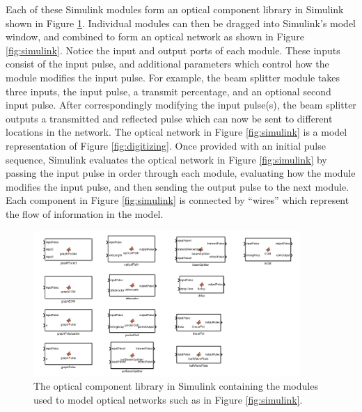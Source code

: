 \documentclass[pdftex,12pt,a4paper]{article}
\begin{document}
Each of these Simulink modules form an optical component library in Simulink shown in Figure \ref{fig:componentLibrary}. Individual modules can then be dragged into Simulink's model window, and combined to form an optical network as shown in Figure \ref{fig:simulink}. Notice the input and output ports of each module. These inputs consist of the input pulse, and  additional parameters which control how the module modifies the input pulse. For example, the beam splitter module takes three inputs, the input pulse, a transmit percentage, and an optional second input pulse. After correspondingly modifying the input pulse(s), the beam splitter outputs a transmitted and reflected pulse which can now be sent to different locations in the network. The optical network in Figure \ref{fig:simulink} is a model representation of Figure \ref{fig:digitizing}. Once provided with an initial pulse sequence, Simulink evaluates the optical network in Figure \ref{fig:simulink} by passing the input pulse in order through each module, evaluating how the module modifies the input pulse, and then sending the output pulse to the next module. Each component in Figure \ref{fig:simulink} is connected by ``wires'' which represent the flow of information in the model.  


\begin{figure}[H]
  \centering
    \includegraphics[width=0.9\textwidth]{OpticalComponentLibrary.PNG}
  \caption{The optical component library in Simulink containing the modules used to model optical networks such as in Figure \ref{fig:simulink}.}
  \label{fig:componentLibrary}
\end{figure}
\end{document}
